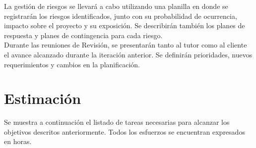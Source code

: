 \documentclass[
11pt, %
oneside, %
spanish, %
singlespacing, %
headsepline, %
chapterinoneline, %
]{MastersDoctoralThesis} %
\begin{document}
La gestión de riesgos se llevará a cabo utilizando una planilla en donde se registrarán los riesgos identificados, junto con su probabilidad de ocurrencia, impacto sobre el proyecto y su exposición. Se describirán también los planes de respuesta y planes de contingencia para cada riesgo. \\

Durante las reuniones de Revisión, se presentarán tanto al tutor como al cliente el avance alcanzado durante la iteración anterior. Se definirán prioridades, nuevos requerimientos y cambios en la planificación.

\section{Estimaci\'on} \label{estimacion}

Se muestra a continuación el listado de tareas necesarias para alcanzar los objetivos descritos anteriormente. Todos los esfuerzos se encuentran expresados en horas.
\end{document}
